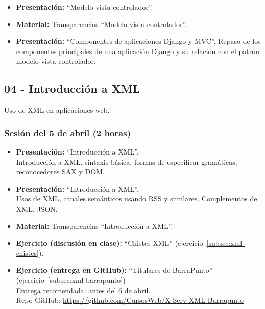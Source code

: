 \documentclass[a4paper,12pt]{article}
\begin{document}
\begin{itemize}
\item \textbf{Presentación:} ``Modelo-vista-controlador''.
\item \textbf{Material:} Transparencias ``Modelo-vista-controlador''.
\item \textbf{Presentación:} ``Componentes de aplicaciones Django y MVC''.
 Repaso de los componentes principales de una aplicación Django y su relación con el patrón modelo-vista-controlador.
\end{itemize}

\subsection{04 - Introducción a XML}

Uso de XML en aplicaciones web.

\subsubsection{Sesión del 5 de abril (2 horas)}

\begin{itemize}
\item \textbf{Presentación:} ``Introducción a XML''. \\
 Introducción a XML, sintaxis básica, formas de especificar gramáticas, reconocedores SAX y DOM.
\item \textbf{Presentación:} ``Introducción a XML''. \\
Usos de XML, canales semánticos usando RSS y similares. Complementos de XML, JSON.
\item \textbf{Material:} Transparencias ``Introducción a XML''.
\item \textbf{Ejercicio (discusión en clase):} ``Chistes XML'' (ejercicio~\ref{subsec:xml-chistes}).
\item \textbf{Ejercicio (entrega en GitHub):} ``Titulares de BarraPunto'' (ejercicio~\ref{subsec:xml-barrapunto}) \\
  Entrega recomendada: antes del 6 de abril. \\
  Repo GitHub: \url{https://github.com/CursosWeb/X-Serv-XML-Barrapunto}
\end{itemize}

\end{document}
